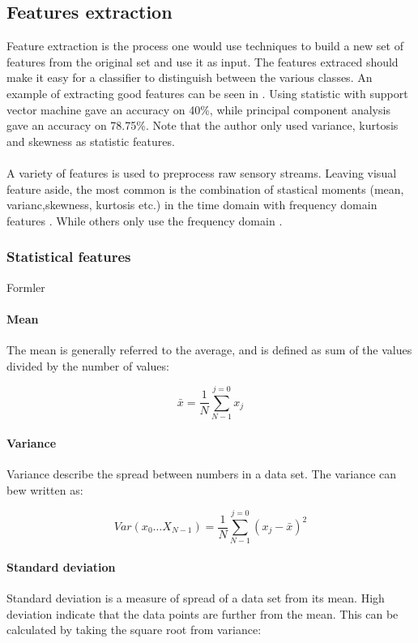 \documentclass[USenglish]{ifimaster}  %
\begin{document}
\subsection{Features extraction} \label{feature_extraction}
Feature extraction is the process one would use techniques to build a new set of features from the original set and use it as input. The features extraced should make it easy for a classifier to distinguish between the various classes. An example of extracting good features can be seen in \cite{5602459}. Using statistic with support vector machine gave an accuracy on 40\%, while principal component analysis gave an accuracy on 78.75\%. Note that the author only used variance, kurtosis and skewness as statistic features.
\\
\\
A variety of features is used to preprocess raw sensory streams. Leaving visual feature aside, the most common is the combination of stastical moments (mean, varianc,skewness, kurtosis etc.) in the time domain with frequency domain features \cite{5152662} \cite{Giguere2009} \cite{5509309}. While others only use the frequency domain \cite{4543710} \cite{5979766}.

\subsubsection{Statistical features}
Formler\cite{Press:2007:NRE:1403886}
\paragraph{Mean}
The mean is generally referred to the average, and is defined as sum of the values divided by the number of values:

\begin{equation}
   \bar{x} = \frac{1}{N}\sum_{N-1}^{j=0}x_{j}
    \label{eq:mean}
\end{equation}


\paragraph{Variance}
Variance describe the spread between numbers in a data set. The variance can bew written as:

\begin{equation}
  Var(x_0\dotsc X_{N-1})  = \frac{1}{N}\sum_{N-1}^{j=0}(x_{j}-\bar{x})^2
    \label{eq:variance}
\end{equation}

\paragraph{Standard deviation}
Standard deviation is a measure of spread of a data set from its mean. High deviation indicate that the data points are further from the mean. This can be calculated by taking the square root from variance:
\end{document}
